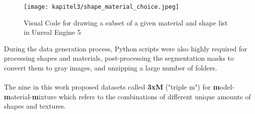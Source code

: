 		\begin{figure}[h]
			\centering
			\texttt{[image: kapitel3/shape\_material\_choice.jpeg]}
			\caption[Visual Code for drawing a subset of a given material and shape list in Unreal Engine 5 by Tobia Ippolito]{Visual Code for drawing a subset of a given material and shape list in Unreal Engine 5}
			\label{img:ue5_material_shape_choice}
		\end{figure}
		
		During the data generation process, Python scripts were also highly required for processing shapes and materials, post-processing the segmentation masks to convert them to gray images, and unzipping a large number of folders.\\
		\\
		The nine in this work proposed datasets called \textbf{3xM} ("triple m") for \textbf{m}odel-\textbf{m}aterial-\textbf{m}ixture which refers to the combinations of different unique amounts of shapes and textures.
		
		
	\clearpage

